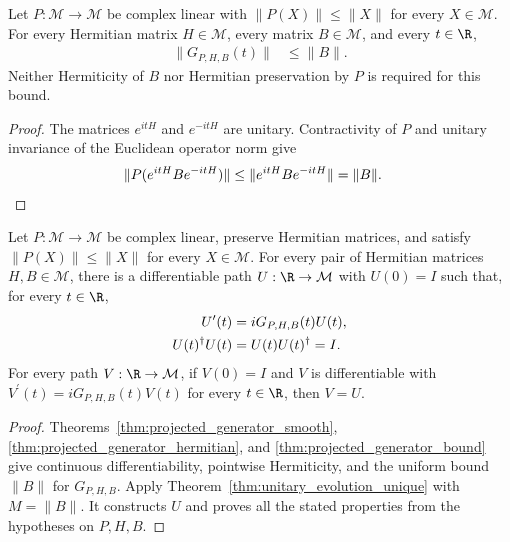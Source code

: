 \begin{theorem}
    \label{thm:projected_generator_bound}
    \leanok
    Let $P:\mathcal M\to\mathcal M$ be complex linear with
    $\|P(X)\|\le\|X\|$ for every $X\in\mathcal M$.
    For every Hermitian matrix $H\in\mathcal M$, every matrix
    $B\in\mathcal M$, and every $t\in\R$,
    \begin{align}
        \|G_{P,H,B}(t)\|&\le\|B\|.
        \label{eq:projected_generator_bound}
    \end{align}
    Neither Hermiticity of $B$ nor Hermitian preservation by $P$ is
    required for this bound.
\end{theorem}
\begin{proof}\leanok
    The matrices $e^{itH}$ and $e^{-itH}$ are unitary. Contractivity of
    $P$ and unitary invariance of the Euclidean operator norm give
    \begin{align}
        \|P(e^{itH}Be^{-itH})\|
            &\le\|e^{itH}Be^{-itH}\|=\|B\|.\notag
    \end{align}
\end{proof}

\begin{theorem}
    \label{thm:projected_unitary_evolution}
    \leanok
    Let $P:\mathcal M\to\mathcal M$ be complex linear, preserve
    Hermitian matrices, and satisfy $\|P(X)\|\le\|X\|$ for every
    $X\in\mathcal M$. For every pair of Hermitian matrices
    $H,B\in\mathcal M$, there is a differentiable path
    $U:\R\to\mathcal M$ with $U(0)=I$ such that, for every $t\in\R$,
    \begin{align}
        U^{\prime}(t)&=iG_{P,H,B}(t)U(t),
        \label{eq:projected_unitary_evolution}\\
        U(t)^\dagger U(t)&=U(t)U(t)^\dagger=I.\notag
    \end{align}
    For every path $V:\R\to\mathcal M$, if $V(0)=I$ and $V$ is
    differentiable with $V^{\prime}(t)=iG_{P,H,B}(t)V(t)$ for every $t\in\R$,
    then $V=U$.
\end{theorem}
\begin{proof}\leanok
    Theorems~\ref{thm:projected_generator_smooth},
    \ref{thm:projected_generator_hermitian}, and
    \ref{thm:projected_generator_bound} give continuous differentiability,
    pointwise Hermiticity, and the uniform bound $\|B\|$ for
    $G_{P,H,B}$. Apply Theorem~\ref{thm:unitary_evolution_unique} with
    $M=\|B\|$. It constructs $U$ and proves all the stated properties
    from the hypotheses on $P,H,B$.
\end{proof}

